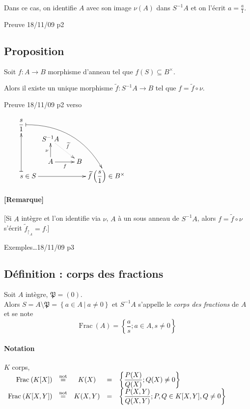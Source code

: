 \documentclass[reqno,a4paper,10pt]{report}
\newcommand{\mt}[1]{\widetilde{#1}} %
\newcommand{\set}[1]{\left\lbrace #1 \right\rbrace} %
\newcommand{\Frac}{\mathrm{Frac}\:} %
\newcommand{\rstrct}[2]{{#1}_{\upharpoonright_{#2}}} %
\newcommand{\such}{\ | \ }
\newcommand{\tnot}[1]{\overset{\text{not}}{ #1 }}
\begin{document}
Dans ce cas, on identifie $A$ avec son image $\nu(A)$ dans $S^{-1}A$ et on
l'écrit $a=\frac{a}{1}$.

  Preuve 18/11/09 p2

\subsection{Proposition}
Soit $f: A \to B$ morphisme d'anneau tel que $f(S)\subseteq B^\times$.

Alors il existe un unique morphisme $\mt f : S^{-1}A \to B$ tel que $f=\mt f
\circ \nu$.

  Preuve 18/11/09 p2 verso

$\xymatrix@=0.2pc{
\dfrac{s}{1} \ar@/^2pc/@{|->}[dddddrrrrr]\\
& S^{-1}A \ar@{.>}[dddrrr]^{\mt f} \\
\\ \\
& A \ar[uuu]^{\nu} \ar[rrr]_f &&& B\\
\qquad s \in S \ar@{|->}[uuuuu] \ar[rrrrr] & &&& & \mt f\left( \dfrac{s}{1}
\right)\in B^\times }$

\paragraph{[Remarque]}
   [Si $A$ intègre et l'on identifie via $\nu$, $A$ à un sous anneau de
$S^{-1}A$, alors $f=\mt f \circ \nu$ s'écrit $\rstrct{\mt f}{A} = f$.]

  Exemples\dots 18/11/09 p3

\subsection{Définition : corps des fractions}
Soit $A$ intègre, $\mathfrak P = (0)$.\\
Alors $S=A\setminus \mathfrak P = \set{a\in A \such a\neq 0}$ et $S^{-1}A$
s'appelle le \emph{corps des fractions} de $A$ et se note
\[\Frac(A)=\set{\dfrac{a}{s}; a \in A, s \neq 0}\]

\paragraph{Notation} $K$ corps,
$\begin{array}[t]{rcccl}
  \Frac(K[X]) &\tnot =& K(X) &=& \set{\dfrac{P(X)}{Q(X)}; Q(X) \neq 0}\\
  \Frac(K[X,Y]) &\tnot =& K(X,Y) &=& \set{\dfrac{P(X,Y)}{Q(X,Y)};P,Q \in
  K[X,Y], Q \neq 0}
\end{array}
$
\end{document}
